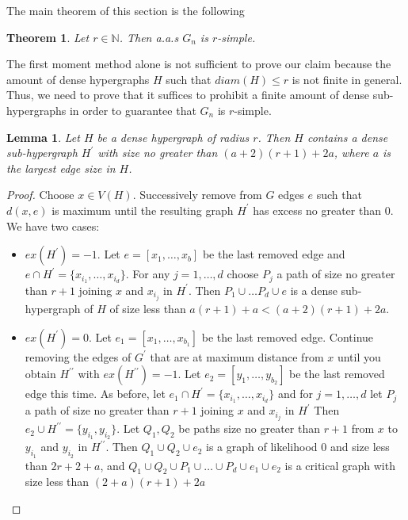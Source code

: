 \documentclass[12pt,notitlepage,a4paper]{article}
\newtheorem{theorem}{Theorem}[section]
\newtheorem{lemma}{Lemma}[section]
\theoremstyle{definition}
\newcommand{\N}{\mathbb{N}}
\begin{document}
The main theorem of this section is the following
\begin{theorem} \label{thm:simple}
	Let $r\in \N$. Then a.a.s $G_n$ is $r$-simple. 
\end{theorem}
	The first moment method alone is not sufficient
	to prove our claim because the amount of dense 
	hypergraphs	$H$ such that $diam(H)\leq r$ is not finite
	in general. Thus, we need to prove that it suffices to
	prohibit a finite amount of dense sub-hypergraphs in order
	to guarantee that $G_n$ is $r$-simple.
\begin{lemma}
	Let $H$ be a dense hypergraph of radius $r$.
	Then $H$ contains a dense sub-hypergraph $H^\prime$ 
	with size no greater than
	$(a+2)(r+1)+2a$, where $a$ is the largest edge size in $H$. 
\end{lemma}
\begin{proof}
	Choose $x\in V(H)$. Successively remove from $G$ edges $e$
	such that $d(x, e)$ is maximum until the resulting graph 
	$H^\prime$ has excess no greater than $0$. We have two cases:
	\begin{itemize}[leftmargin=*]
		\item $ex(H^\prime)=-1$. Let $e=[x_1, \dots, x_b]$ be
		the last removed edge and
		$e\cap H^\prime=\{ x_{i_1}, \dots, x_{i_d}\}$.
		For any $j=1,\dots, d$ choose 
		$P_j$ a path of size no greater than $r+1$ joining
		$x$ and $x_{i_j}$ in $H^\prime$.   
		Then $P_1\cup \dots P_d \cup e$ is a dense sub-hypergraph of $H$
		of size less than $a(r+1) + a< (a+2)(r+1) + 2a$.
		\item $ex(H^\prime)=0$. Let $e_1=[x_1, \dots, x_{b_1}]$ be the
		last removed edge. Continue removing the edges of $G^\prime$ 
		that are at maximum distance from $x$ until you obtain 
		$H^{\prime \prime}$ with $ex(H^{\prime\prime})=-1$. Let 
		$e_2=[y_1, \dots, y_{b_2}]$ be the last removed edge this time.
		As before, let $e_1\cap H^\prime=\{ x_{i_1}, \dots, x_{i_d}\}$
		and for $j=1,\dots, d$ let $P_j$ a path of size no greater than $r+1$ 
		joining	$x$ and $x_{i_j}$ in $H^\prime$
		Then $e_2 \cup H^{\prime \prime}=\{ y_{i_1}, y_{i_2}  \}$.
		Let $Q_1, Q_2$ be paths size no greater than $r+1$ from
		$x$ to $y_{i_1}$ and $y_{i_2}$ in $H^{\prime \prime}$.
		Then $Q_1 \cup Q_2 \cup e_2$ is a graph of likelihood $0$ 
		and size less than $2r+2 + a$,
		and $Q_1\cup Q_2\cup P_1 \cup \dots \cup P_d \cup e_1 \cup e_2$ 
		is a critical graph	with size less than $(2+a)(r+1) + 2a$	
	\end{itemize} 
\end{proof}
\end{document}
